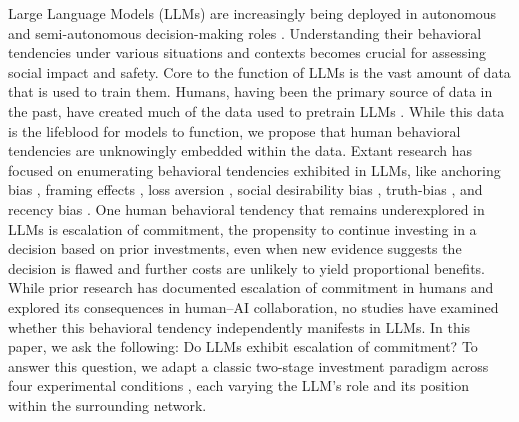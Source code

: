 \documentclass{article}
\begin{document}
Large Language Models (LLMs) are increasingly being deployed in autonomous and semi-autonomous decision-making roles \cite{Cui-2024, Liu-2025, Rajani-2025, Lin-2025, Nie-2025, Ren-2025, Raza-2025, Sha-2023}. Understanding their behavioral tendencies under various situations and contexts becomes crucial for assessing social impact and safety. Core to the function of LLMs is the vast amount of data that is used to train them. Humans, having been the primary source of data in the past, have created much of the data used to pretrain LLMs \cite{brown-2020, grattafiori-2024}. While this data is the lifeblood for models to function, we propose that human behavioral tendencies are unknowingly embedded within the data. Extant research has focused on enumerating behavioral tendencies exhibited in LLMs, like anchoring bias \cite{Lou-2024}, framing effects \cite{Lior-2025}, loss aversion \cite{Jia-2024}, social desirability bias \cite{Salecha-2024}, truth-bias \cite{Barkett-2025, Markowitz-2023}, and recency bias \cite{Li-2024}. One human behavioral tendency that remains underexplored in LLMs is escalation of commitment, the propensity to continue investing in a decision based on prior investments, even when new evidence suggests the decision is flawed and further costs are unlikely to yield proportional benefits. While prior research has documented escalation of commitment in humans and explored its consequences in human–AI collaboration, no studies have examined whether this behavioral tendency independently manifests in LLMs. In this paper, we ask the following: Do LLMs exhibit escalation of commitment? To answer this question, we adapt a classic two-stage investment paradigm across four experimental conditions \cite{Staw-1976}, each varying the LLM’s role and its position within the surrounding network. %

  
\end{document}
